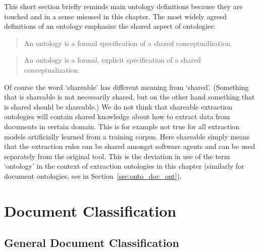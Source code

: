 This short section briefly reminds main ontology definitions because they are touched and in a sense misused in this chapter. The most widely agreed definitions of an ontology emphasize the shared aspect of ontologies: 
\begin{quote}
An ontology is a formal specification of a shared conceptualization.	\citep{so17864}
\end{quote}

\begin{quote}
An ontology is a formal, explicit specification of a shared conceptualization. \citep{Studer1998161}
\end{quote}

Of course the word `shareable' has different meaning from `shared'. (Something that is shareable is not necessarily shared, but on the other hand something that is shared should be shareable.) We do not think that shareable extraction ontologies will contain shared knowledge about how to extract data from documents in certain domain. This is for example not true for all extraction models artificially learned from a training corpus. Here shareable simply means that the extraction rules can be shared amongst software agents and can be used separately from the original tool. This is the deviation in use of the term `ontology' in the context of extraction ontologies in this chapter (similarly for document ontologies, see in Section~\ref{sec:onto_doc_ont}).






\section{Document Classification} \label{sec:relwork_doc_classification} 

\subsection{General Document Classification}

